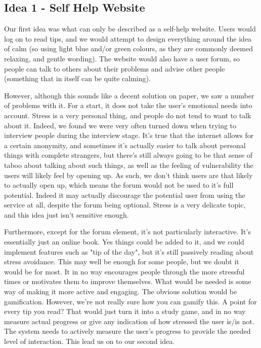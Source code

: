 \documentclass{scrartcl}
\begin{document}
\subsection{Idea 1 - Self Help Website}
Our first idea was what can only be described as a self-help website. Users would log on to read tips, and we would attempt to
design everything around the idea of calm (so using light blue and/or green colours, as they are commonly deemed relaxing,
and gentle wording). The website would also have a user forum, so people can talk to others about their problems and advise
other people (something that in itself can be quite calming).

However, although this sounds like a decent solution on paper, we saw a number of problems with it.
For a start, it does not take the user's emotional needs into account. Stress is a very personal thing, and people do not
tend to want to talk about it. Indeed, we found we were very often turned down when trying to interview people during the
interview stage. It's true that the internet allows for a certain anonymity, and sometimes it's actually easier to talk
about personal things with complete strangers, but there's still always going to be that sense of taboo about talking about
such things, as well as the feeling of vulnerability the users will likely feel by opening up. As such, we don't think users
are that likely to actually open up, which means the forum would not be used to it's full potential. Indeed it may actually
discourage the potential user from using the service at all, despite the forum being optional. Stress is a very delicate
topic, and this idea just isn't sensitive enough.

Furthermore, except for the
forum element, it's not particularly interactive. It's essentially just an online book. Yes things could be added to it, and we
could implement features such as "tip of the day", but it's still passively reading about stress avoidance. This may well be
enough for some people, but we doubt it would be for most. It in no way encourages people through the more stressful times or
motivates them to improve themselves. What would be needed is some way of making it more active and engaging. The obvious
solution would be gamification. However, we're not really sure how you can gamify this. A point for every tip you read?
That would just turn it into a study game, and in no way measure actual progress or give any indication of how stressed the user
is/is not. The system needs to actively measure the user's progress to provide the needed level of interaction. This lead
us on to our second idea.
\end{document}
